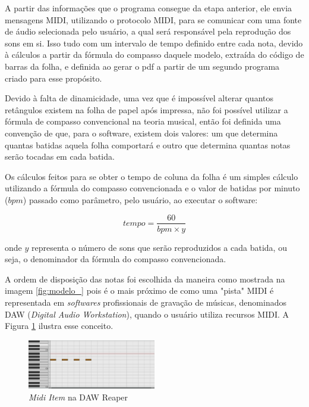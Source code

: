 \documentclass[12pt]{report}
\begin{document}
A partir das informações que o programa consegue da etapa anterior,
ele envia mensagens MIDI, utilizando o protocolo MIDI, para se
comunicar com uma fonte de áudio selecionada pelo usuário, a qual será
responsável pela reprodução dos sons em si. Isso tudo com um intervalo
de tempo definido entre cada nota, devido à cálculos a partir da
fórmula do compasso daquele modelo, extraída do código de barras da
folha, e definida ao gerar o pdf a partir de um segundo programa
criado para esse propósito.

Devido à falta de dinamicidade, uma vez que é impossível alterar
quantos retângulos existem na folha de papel após impressa, não foi
possível utilizar a fórmula de compasso convencional na teoria
musical, então foi definida uma convenção de que, para o software,
existem dois valores: um que determina quantas batidas aquela folha
comportará e outro que determina quantas notas serão tocadas em cada
batida.

Os cálculos feitos para se obter o tempo de coluna da folha é um
simples cálculo utilizando a fórmula do compasso convencionada e o
valor de batidas por minuto ($bpm$) passado como parâmetro, pelo usuário, ao
executar o software:

\begin{equation}
tempo = \dfrac{60}{bpm \times y}
\end{equation}

\noindent onde $y$ representa o número de sons que serão reproduzidos
a cada batida, ou seja, o denominador da fórmula do compasso
convencionada.

A ordem de disposição das notas foi escolhida da maneira como mostrada
na imagem \ref{fig:modelo_} pois é o mais próximo de como uma "pista"
MIDI é representada em {\it softwares} profissionais de gravação de
músicas, denominados DAW ({\it Digital Audio Workstation}), quando o
usuário utiliza recursos MIDI. A Figura \ref{fig:reaper} ilustra esse
conceito.

\begin{figure}[H]
  \centering
    \includegraphics[width=0.5\textwidth]{imagens/midi_item_reaper.png}
    \caption{{\it Midi Item} na DAW Reaper}
  \label{fig:reaper}
\end{figure}
\end{document}
